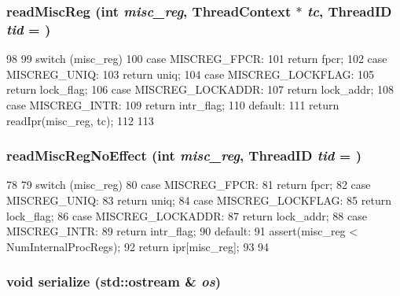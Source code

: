 \hypertarget{classAlphaISA_1_1ISA_a81ac5a0c0d9b625997d7737f911743b1}{
\subsubsection[{readMiscReg}]{ readMiscReg (int {\em misc\_\-reg}, \/  {\bf ThreadContext} $\ast$ {\em tc}, \/  {\bf ThreadID} {\em tid} = {})}}
\label{classAlphaISA_1_1ISA_a81ac5a0c0d9b625997d7737f911743b1}



\begin{DoxyCode}
98 {
99     switch (misc_reg) {
100       case MISCREG_FPCR:
101         return fpcr;
102       case MISCREG_UNIQ:
103         return uniq;
104       case MISCREG_LOCKFLAG:
105         return lock_flag;
106       case MISCREG_LOCKADDR:
107         return lock_addr;
108       case MISCREG_INTR:
109         return intr_flag;
110       default:
111         return readIpr(misc_reg, tc);
112     }
113 }
\end{DoxyCode}
\hypertarget{classAlphaISA_1_1ISA_af2ec8925148a53b9bddefb7fb65a7223}{
\subsubsection[{readMiscRegNoEffect}]{ readMiscRegNoEffect (int {\em misc\_\-reg}, \/  {\bf ThreadID} {\em tid} = {})}}
\label{classAlphaISA_1_1ISA_af2ec8925148a53b9bddefb7fb65a7223}



\begin{DoxyCode}
78 {
79     switch (misc_reg) {
80       case MISCREG_FPCR:
81         return fpcr;
82       case MISCREG_UNIQ:
83         return uniq;
84       case MISCREG_LOCKFLAG:
85         return lock_flag;
86       case MISCREG_LOCKADDR:
87         return lock_addr;
88       case MISCREG_INTR:
89         return intr_flag;
90       default:
91         assert(misc_reg < NumInternalProcRegs);
92         return ipr[misc_reg];
93     }
94 }
\end{DoxyCode}
\hypertarget{classAlphaISA_1_1ISA_a53e036786d17361be4c7320d39c99b84}{
\subsubsection[{serialize}]{\setlength{\rightskip}{0pt plus 5cm}void serialize (std::ostream \& {\em os})}}
\label{classAlphaISA_1_1ISA_a53e036786d17361be4c7320d39c99b84}



